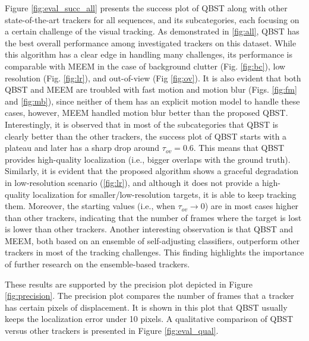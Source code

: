 \documentclass[10pt, conference, compsocconf]{IEEEtran}
\begin{document}
Figure \ref{fig:eval_succ_all} presents the success plot of QBST along with other state-of-the-art trackers for all sequences, and its subcategories, each focusing on a certain challenge of the visual tracking. As demonstrated in \ref{fig:all}, QBST has the best overall performance among investigated trackers on this dataset. While this algorithm has a clear edge in handling many challenges, its performance is comparable with MEEM \cite{zhang2014meem} in the case of background clutter (Fig. \ref{fig:bc}), low resolution (Fig. \ref{fig:lr}), and out-of-view (Fig \ref{fig:ov}). It is also evident that both QBST and MEEM are troubled with fast motion and motion blur (Figs. \ref{fig:fm} and \ref{fig:mb}), since neither of them has an explicit motion model to handle these cases, however, MEEM handled motion blur better than the proposed QBST. Interestingly, it is observed that in most of the subcategories that QBST is clearly better than the other trackers, the success plot of QBST starts with a plateau and later has a sharp drop around $\tau_{ov} = 0.6$. This means that QBST provides high-quality localization (i.e., bigger overlaps with the ground truth). Similarly, it is evident that the proposed algorithm shows a graceful degradation in low-resolution scenario (\ref{fig:lr}), and although it does not provide a high-quality localization for smaller/low-resolution targets, it is able to keep tracking them. Moreover, the starting values (i.e., when $\tau_{ov} \rightarrow 0$) are in most cases higher than other trackers, indicating that the number of frames where the target is lost is lower than other trackers. Another interesting observation is that QBST and MEEM, both based on an ensemble of self-adjusting classifiers, outperform other trackers in most of the tracking challenges. This finding highlights the importance of further research on the ensemble-based trackers.

These results are supported by the precision plot depicted in Figure \ref{fig:precision}. The precision plot compares the number of frames that a tracker has certain pixels of displacement. It is shown in this plot that QBST usually keeps the localization error under 10 pixels. A qualitative comparison of QBST versus other trackers is presented in Figure \ref{fig:eval_qual}.
\end{document}
